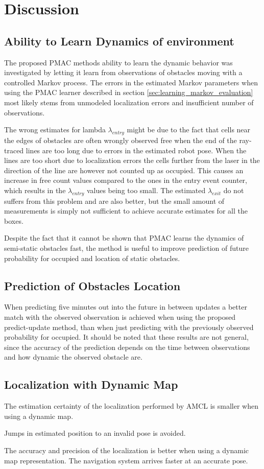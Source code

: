 \section{Discussion}


\subsection{Ability to Learn Dynamics of environment}
The proposed PMAC methods ability to learn the dynamic behavior was investigated by letting it learn from observations of obstacles moving with a controlled Markov process.
The errors in the estimated Markov parameters when using the PMAC learner described in section \ref{sec:learning_markov_evaluation} most likely stems from unmodeled localization errors and insufficient number of observations. 

The wrong estimates for lambda $\lambda_{entry}$ might be due to the fact that cells near the edges of obstacles are often wrongly observed free when the end of the ray-traced lines are too long due to errors in the estimated robot pose.
When the lines are too short due to localization errors the cells further from the laser in the direction of the line are however not counted up as occupied.
This causes an increase in free count values compared to the ones in the entry event counter, which results in the $\lambda_{entry}$ values being too small.
The estimated $\lambda_{exit}$ do not suffers from this problem and are also better, but the small amount of measurements is simply not sufficient to achieve accurate estimates for all the boxes.

Despite the fact that it cannot be shown that PMAC learns the dynamics of semi-static obstacles fast,
the method is useful to improve prediction of future probability for occupied and location of static obstacles.

\subsection{Prediction of Obstacles Location}
When predicting five minutes out into the future in between updates a better match with the observed observation is achieved when using the proposed predict-update method, than when just predicting with the previously observed probability for occupied.
It should be noted that these results are not general, since the accuracy of the prediction depends on the time between observations and how dynamic the observed obstacle are.

\subsection{Localization with Dynamic Map}
The estimation certainty of the localization performed by AMCL is smaller when using a dynamic map.

Jumps in estimated position to an invalid pose is avoided.

The accuracy and precision of the localization is better when using a dynamic map representation.
The navigation system arrives faster at an accurate pose.


